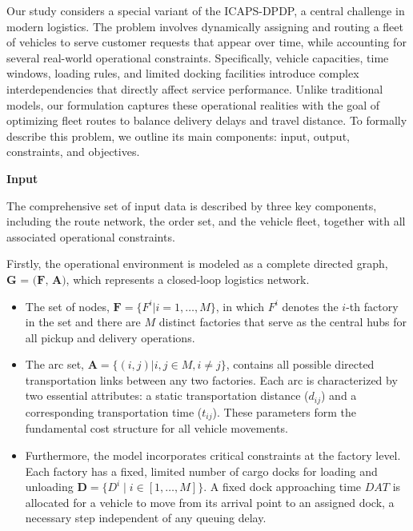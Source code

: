 \documentclass[preprint,12pt]{elsarticle}
\begin{document}
Our study considers a special variant of the ICAPS-DPDP, a central challenge in modern logistics. The problem involves dynamically assigning and routing a fleet of vehicles to serve customer requests that appear over time, while accounting for several real-world operational constraints. Specifically, vehicle capacities, time windows, loading rules, and limited docking facilities introduce complex interdependencies that directly affect service performance. Unlike traditional models, our formulation captures these operational realities with the goal of optimizing fleet routes to balance delivery delays and travel distance. To formally describe this problem, we outline its main components: input, output, constraints, and objectives.

\textbf{Input}

The comprehensive set of input data is described by three key components, including the route network, the order set, and the vehicle fleet, together with all associated operational constraints.

Firstly, the operational environment is modeled as a complete directed graph, $\textbf{G = (F, A)}$, which represents a closed-loop logistics network. 
\begin{itemize}
    \item The set of nodes, $\textbf{F} = \{F^i | i = 1, \dots, M\}$, in which $F^i$ denotes the $i$-th factory in the set and there are $M$ distinct factories that serve as the central hubs for all pickup and delivery operations.
    
    \item The arc set, $\textbf{A} = \{(i, j) | i, j \in M, i \neq j\}$, contains all possible directed transportation links between any two factories. Each arc is characterized by two essential attributes: a static transportation distance ($d_{ij}$) and a corresponding transportation time ($t_{ij}$). These parameters form the fundamental cost structure for all vehicle movements.

    \item Furthermore, the model incorporates critical constraints at the factory level. Each factory has a fixed, limited number of cargo docks for loading and unloading $\textbf{D} = \{ D^i \mid i \in [1 , \dots , M]\}$. A fixed dock approaching time $DAT$ is allocated for a vehicle to move from its arrival point to an assigned dock, a necessary step independent of any queuing delay.

\end{itemize}
\end{document}
